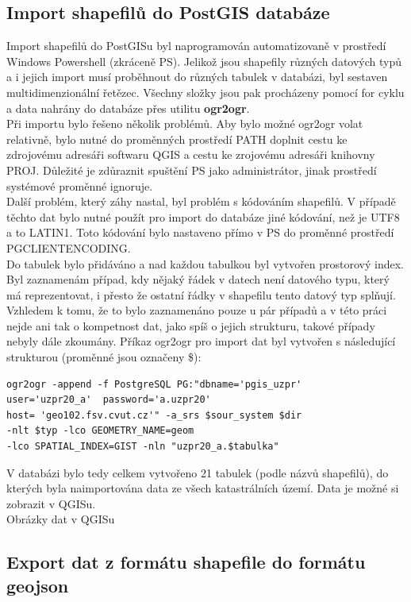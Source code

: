 \documentclass[12pt]{article}
\begin{document}
\subsection{Import shapefilů do PostGIS databáze}

Import shapefilů do PostGISu byl naprogramován automatizovaně v prostředí Windows Powershell (zkráceně PS). Jelikož jsou shapefily různých datových typů a i jejich import musí proběhnout do různých tabulek v databázi, byl sestaven multidimenzionální řetězec. Všechny složky jsou pak procházeny pomocí for cyklu a data nahrány do databáze přes utilitu \textbf{ogr2ogr}. \\
\indent Při importu bylo řešeno několik problémů. Aby bylo možné ogr2ogr volat relativně, bylo nutné do proměnných prostředí PATH doplnit cestu ke zdrojovému adresáři softwaru QGIS a cestu ke zrojovému adresáři knihovny PROJ. Důležité je zdůraznit spuštění PS jako administrátor, jinak prostředí systémové proměnné ignoruje. \\
\indent Další problém, který záhy nastal, byl problém s kódováním shapefilů. V případě těchto dat bylo nutné použít pro import do databáze jiné kódování, než je UTF8 a to LATIN1. Toto kódování bylo nastaveno přímo v PS do proměnné prostředí PGCLIENTENCODING. \\
\indent Do tabulek bylo přidáváno a nad každou tabulkou byl vytvořen prostorový index. Byl zaznamenám případ, kdy nějaký řádek v datech není datového typu, který má reprezentovat, i přesto že ostatní řádky v shapefilu tento datový typ splňují. Vzhledem k tomu, že to bylo zaznamenáno pouze u pár případů a v této práci nejde ani tak o kompetnost dat, jako spíš o jejich strukturu, takové případy nebyly dále zkoumány. Příkaz ogr2ogr pro import dat byl vytvořen s následující strukturou (proměnné jsou označeny \$):

\begin{lstlisting}
ogr2ogr -append -f PostgreSQL PG:"dbname='pgis_uzpr' 
user='uzpr20_a'  password='a.uzpr20' 
host= 'geo102.fsv.cvut.cz'" -a_srs $sour_system $dir 
-nlt $typ -lco GEOMETRY_NAME=geom 
-lco SPATIAL_INDEX=GIST -nln "uzpr20_a.$tabulka"
\end{lstlisting}

V databázi bylo tedy celkem vytvořeno 21 tabulek (podle názvů shapefilů), do kterých byla naimportována data ze všech katastrálních území. Data je možné si zobrazit v QGISu.\\

Obrázky dat v QGISu

\subsection{Export dat z formátu shapefile do formátu geojson}
\end{document}
